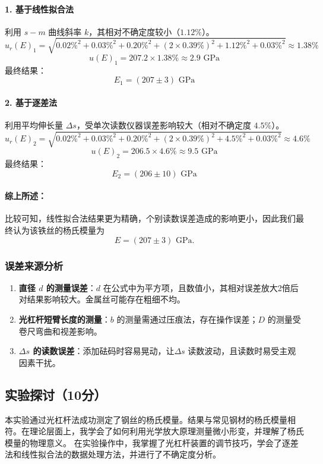 \documentclass[]{../template/Report}%
\begin{document}
\begin{fullreportonly}
    \paragraph{1. 基于线性拟合法}
    利用 $s-m$ 曲线斜率 $k$，其相对不确定度较小（$1.12\%$）。
    \[ u_r(E)_1 = \sqrt{0.02\%^2 + 0.03\%^2 + 0.20\%^2 + (2\times 0.39\%)^2 + 1.12\%^2 + 0.03\%^2} \approx 1.38\% \]
    \[ u(E)_1 = 207.2 \times 1.38\% \approx 2.9 \text{ GPa} \]
    最终结果：
    $$\boxed{E_1 = (207 \pm 3) \text{ GPa}}$$

    \paragraph{2. 基于逐差法}
    利用平均伸长量 $\Delta s$，受单次读数仪器误差影响较大（相对不确定度 $4.5\%$）。
    \[ u_r(E)_2 = \sqrt{0.02\%^2 + 0.03\%^2 + 0.20\%^2 + (2\times 0.39\%)^2 + 4.5\%^2 + 0.03\%^2} \approx 4.6\% \]
    \[ u(E)_2 = 206.5 \times 4.6\% \approx 9.5 \text{ GPa} \]
    最终结果：
    $$\boxed{E_2 = (206 \pm 10) \text{ GPa}}$$

    \paragraph{综上所述：}比较可知，线性拟合法结果更为精确，个别读数误差造成的影响更小，因此我们最终认为该铁丝的杨氏模量为
    $$\boxed{E = (207 \pm 3) \text{ GPa}}.$$

    \subsubsection{误差来源分析}
    \begin{enumerate}
        \item \textbf{直径 $d$ 的测量误差}：$d$ 在公式中为平方项，且数值小，其相对误差放大2倍后对结果影响较大。金属丝可能存在粗细不均。
        \item \textbf{光杠杆短臂长度的测量}：$b$ 的测量需通过压痕法，存在操作误差；$D$ 的测量受卷尺弯曲和视差影响。
        \item \textbf{$\Delta s$ 的读数误差}：添加砝码时容易晃动，让$\Delta s$ 读数波动，且读数时易受主观因素干扰。
    \end{enumerate}

    \subsection{实验探讨（10分）}
    本实验通过光杠杆法成功测定了钢丝的杨氏模量。结果与常见钢材的杨氏模量相符。在理论层面上，我学会了如何利用光学放大原理测量微小形变，并理解了杨氏模量的物理意义。
    在实验操作中，我掌握了光杠杆装置的调节技巧，学会了逐差法和线性拟合法的数据处理方法，并进行了不确定度分析。


\end{fullreportonly}
\end{document}
